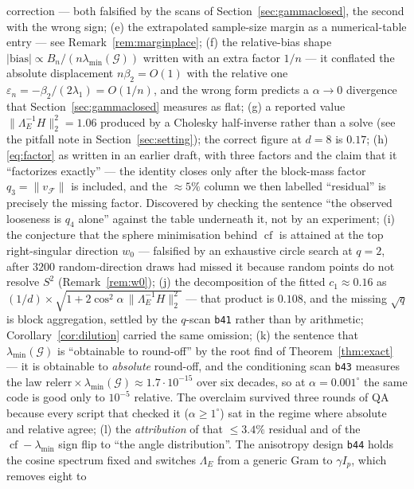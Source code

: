 \documentclass[11pt]{article}
\theoremstyle{remark}
\newcommand{\Gr}{\mathcal{G}}
\newcommand{\Le}{\Lambda_E}
\newcommand{\Cnorm}{\bigl\|\Le^{-1}H\bigr\|_2^2}
\begin{document}
\begin{enumerate}
correction --- both falsified by the scans of Section~\ref{sec:gammaclosed}, the second
with the wrong sign; (e) the extrapolated sample-size margin as a numerical-table entry
--- see Remark~\ref{rem:marginplace}; (f) the relative-bias shape
$|\text{bias}|\propto B_n/(n\lambda_{\min}(\Gr))$ written with an extra factor $1/n$ ---
it conflated the absolute displacement $n\beta_2=O(1)$ with the relative one
$\varepsilon_n=-\beta_2/(2\lambda_1)=O(1/n)$, and the wrong form predicts a
$\alpha\to0$ divergence that Section~\ref{sec:gammaclosed} measures as flat; (g) a
reported value $\|\Le^{-1}H\|_2^2=1.06$ produced by a Cholesky half-inverse rather than
a solve (see the pitfall note in Section~\ref{sec:setting}); the correct figure at $d=8$
is $0.17$; (h) \eqref{eq:factor} as written in an earlier draft, with three factors and the
claim that it ``factorizes exactly'' --- the identity closes only after the block-mass
factor $q_3=\|v_{\mathcal F}\|$ is included, and the $\approx5\%$ column we then labelled
``residual'' is precisely the missing factor. Discovered by checking the sentence
``the observed looseness is $q_4$ alone'' against the table underneath it, not by an
experiment; (i) the conjecture that the sphere minimisation behind $\operatorname{cf}$ is attained at
the top right-singular direction $w_0$ --- falsified by an exhaustive circle search at $q=2$, after
$3200$ random-direction draws had missed it because random points do not resolve $S^2$
(Remark~\ref{rem:w0}); (j) the decomposition of the fitted $c_1\approx0.16$ as $(1/d)\times
\sqrt{1+2\cos^2\alpha\,\Cnorm}$ --- that product is $0.108$, and the missing $\sqrt q$ is block
aggregation, settled by the $q$-scan \texttt{b41} rather than by arithmetic; Corollary~\ref{cor:dilution}
carried the same omission; (k) the sentence that $\lambda_{\min}(\Gr)$ is ``obtainable to round-off''
by the root find of Theorem~\ref{thm:exact} --- it is obtainable to \emph{absolute} round-off, and
the conditioning scan \texttt{b43} measures the law $\mathrm{relerr}\times\lambda_{\min}(\Gr)\approx1.7\cdot10^{-15}$ over six
decades, so at $\alpha=0.001^\circ$ the same code is good only to $10^{-5}$ relative. The overclaim
survived three rounds of QA because every script that checked it ($\alpha\ge1^\circ$) sat in the regime
where absolute and relative agree; (l) the \emph{attribution} of that $\le3.4\%$ residual and of the
$\operatorname{cf}-\lambda_{\min}$ sign flip to ``the angle distribution''. The anisotropy design \texttt{b44} holds the
cosine spectrum fixed and switches $\Le$ from a generic Gram to $\gamma I_p$, which removes eight to

\end{enumerate}
\end{document}

